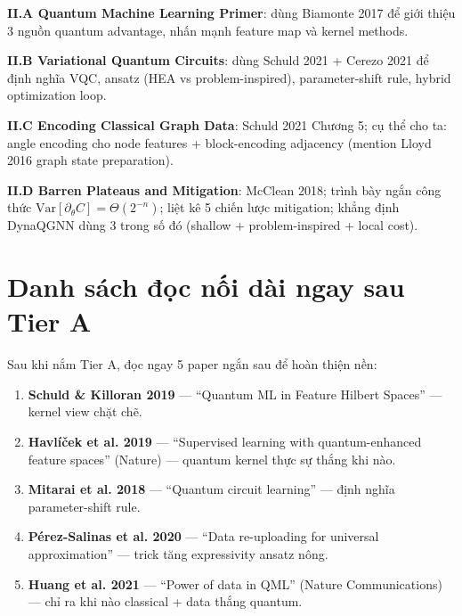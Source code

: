 \documentclass[11pt,a4paper]{article}
\begin{document}
\begin{note}
\textbf{II.A Quantum Machine Learning Primer}: dùng Biamonte 2017 để giới thiệu 3 nguồn quantum advantage, nhấn mạnh feature map và kernel methods.

\textbf{II.B Variational Quantum Circuits}: dùng Schuld 2021 + Cerezo 2021 để định nghĩa VQC, ansatz (HEA vs problem-inspired), parameter-shift rule, hybrid optimization loop.

\textbf{II.C Encoding Classical Graph Data}: Schuld 2021 Chương 5; cụ thể cho ta: angle encoding cho node features + block-encoding adjacency (mention Lloyd 2016 graph state preparation).

\textbf{II.D Barren Plateaus and Mitigation}: McClean 2018; trình bày ngắn công thức $\mathrm{Var}[\partial_\theta C] = \Theta(2^{-n})$; liệt kê 5 chiến lược mitigation; khẳng định DynaQGNN dùng 3 trong số đó (shallow + problem-inspired + local cost).
\end{note}

\section{Danh sách đọc nối dài ngay sau Tier A}

Sau khi nắm Tier A, đọc ngay 5 paper ngắn sau để hoàn thiện nền:

\begin{enumerate}
  \item \textbf{Schuld \& Killoran 2019} --- ``Quantum ML in Feature Hilbert Spaces'' --- kernel view chặt chẽ.
  \item \textbf{Havlíček et al. 2019} --- ``Supervised learning with quantum-enhanced feature spaces'' (Nature) --- quantum kernel thực sự thắng khi nào.
  \item \textbf{Mitarai et al. 2018} --- ``Quantum circuit learning'' --- định nghĩa parameter-shift rule.
  \item \textbf{Pérez-Salinas et al. 2020} --- ``Data re-uploading for universal approximation'' --- trick tăng expressivity ansatz nông.
  \item \textbf{Huang et al. 2021} --- ``Power of data in QML'' (Nature Communications) --- chỉ ra khi nào classical + data thắng quantum.
\end{enumerate}

\end{document}
